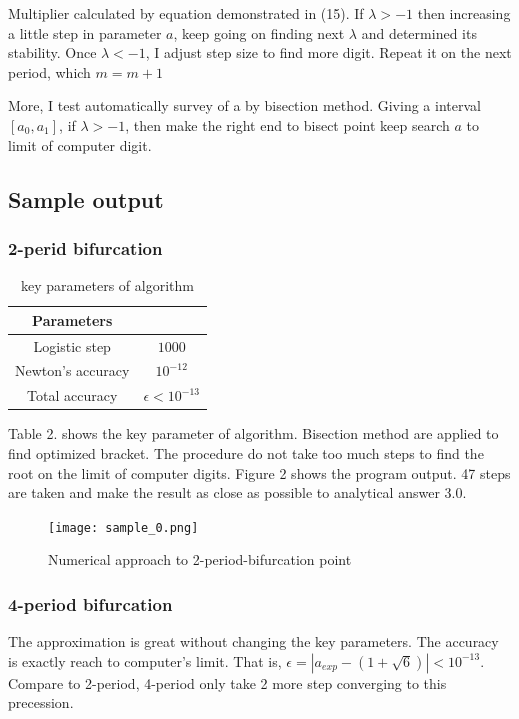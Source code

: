 \documentclass[12pt]{article}
\begin{document}
Multiplier calculated by equation demonstrated in (15). If $\lambda>-1$ then increasing a little step in parameter $a$, keep going on finding next $\lambda$ and determined its stability. Once $\lambda<-1$, I adjust step size to find more digit. Repeat it on the next period, which $m=m+1$

More, I test automatically survey of a by bisection method. Giving a interval $[a_0,a_1]$, if $\lambda>-1$, then make the right end to bisect point keep search $a$ to limit of computer digit.

\subsection{Sample output}
\subsubsection{2-perid bifurcation}
\begin{table}[t!]
	\begin{center}
		\begin{tabular}{c|c}
			\hline
			Parameters & \\ 
			\hline
			Logistic step & $1000$ \\
			Newton's accuracy& $10^{-12}$\\
			Total accuracy&$\epsilon<10^{-13}$\\
			\hline
		\end{tabular}
	\end{center}
	\caption{key parameters of algorithm}
\end{table}
Table 2. shows the key parameter of algorithm. Bisection method are applied to find optimized bracket. The procedure do not take too much steps to find the root on the limit of computer digits. Figure 2 shows the program output. 47 steps are taken and make the result as close as possible to analytical answer 3.0.

\begin{figure}[t!]
	\begin{center}
		\texttt{[image: sample\_0.png]}
		\caption{Numerical approach to 2-period-bifurcation point}
		\label{fig2}
	\end{center}
\end{figure}


\subsubsection{4-period bifurcation}
The approximation is great without changing the key parameters. The accuracy is exactly reach to computer's limit.  That is, $\epsilon=|a_{exp}-(1+\sqrt{6})|<10^{-13}$. Compare to 2-period, 4-period only take 2 more step converging to this precession.
\end{document}
